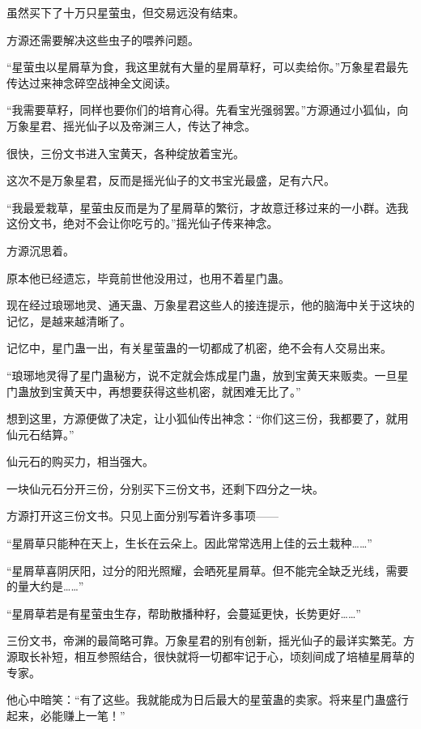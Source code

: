 
\begin{this_body}

虽然买下了十万只星萤虫，但交易远没有结束。

方源还需要解决这些虫子的喂养问题。

“星萤虫以星屑草为食，我这里就有大量的星屑草籽，可以卖给你。”万象星君最先传达过来神念碎空战神全文阅读。

“我需要草籽，同样也要你们的培育心得。先看宝光强弱罢。”方源通过小狐仙，向万象星君、摇光仙子以及帝渊三人，传达了神念。

很快，三份文书进入宝黄天，各种绽放着宝光。

这次不是万象星君，反而是摇光仙子的文书宝光最盛，足有六尺。

“我最爱栽草，星萤虫反而是为了星屑草的繁衍，才故意迁移过来的一小群。选我这份文书，绝对不会让你吃亏的。”摇光仙子传来神念。

方源沉思着。

原本他已经遗忘，毕竟前世他没用过，也用不着星门蛊。

现在经过琅琊地灵、通天蛊、万象星君这些人的接连提示，他的脑海中关于这块的记忆，是越来越清晰了。

记忆中，星门蛊一出，有关星萤蛊的一切都成了机密，绝不会有人交易出来。

“琅琊地灵得了星门蛊秘方，说不定就会炼成星门蛊，放到宝黄天来贩卖。一旦星门蛊放到宝黄天中，再想要获得这些机密，就困难无比了。”

想到这里，方源便做了决定，让小狐仙传出神念：“你们这三份，我都要了，就用仙元石结算。”

仙元石的购买力，相当强大。

一块仙元石分开三份，分别买下三份文书，还剩下四分之一块。

方源打开这三份文书。只见上面分别写着许多事项——

“星屑草只能种在天上，生长在云朵上。因此常常选用上佳的云土栽种……”

“星屑草喜阴厌阳，过分的阳光照耀，会晒死星屑草。但不能完全缺乏光线，需要的量大约是……”

“星屑草若是有星萤虫生存，帮助散播种籽，会蔓延更快，长势更好……”

三份文书，帝渊的最简略可靠。万象星君的别有创新，摇光仙子的最详实繁芜。方源取长补短，相互参照结合，很快就将一切都牢记于心，顷刻间成了培植星屑草的专家。

他心中暗笑：“有了这些。我就能成为日后最大的星萤蛊的卖家。将来星门蛊盛行起来，必能赚上一笔！”


\end{this_body}
